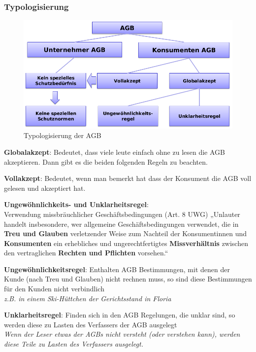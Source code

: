 \hypertarget{typologisierung}{%
\subsubsection{Typologisierung}\label{typologisierung}}

\begin{figure}
\centering
\includegraphics{figures/typolisierungAGB.png}
\caption{Typologisierung der AGB}
\end{figure}

\textbf{Globalakzept}: Bedeutet, dass viele leute einfach ohne zu lesen
die AGB akzeptieren. Dann gibt es die beiden folgenden Regeln zu
beachten.

\textbf{Vollakzept}: Bedeutet, wenn man bemerkt hat dass der Konsument
die AGB voll gelesen und akzeptiert hat.

\textbf{Ungewöhnlichkeits- und Unklarheitsregel}:\\
Verwendung missbräuchlicher Geschäftsbedingungen (Art. 8 UWG) „Unlauter
handelt insbesondere, wer allgemeine Geschäftsbedingungen verwendet, die
in \textbf{Treu und Glauben} verletzender Weise zum Nachteil der
Konsumentinnen und \textbf{Konsumenten} ein erhebliches und
ungerechtfertigtes \textbf{Missverhältnis} zwischen den vertraglichen
\textbf{Rechten und Pflichten} vorsehen.``

\textbf{Ungewöhnlichkeitsregel}: Enthalten AGB Bestimmungen, mit denen
der Kunde (nach Treu und Glauben) nicht rechnen muss, so sind diese
Bestimmungen für den Kunden nicht verbindlich\\
\emph{z.B. in einem Ski-Hüttchen der Gerichtsstand in Floria}

\textbf{Unklarheitsregel}: Finden sich in den AGB Regelungen, die unklar
sind, so werden diese zu Lasten des Verfassers der AGB ausgelegt\\
\emph{Wenn der Leser etwas der AGBs nicht versteht (oder verstehen
kann), werden diese Teile zu Lasten des Verfassers ausgelegt.}

